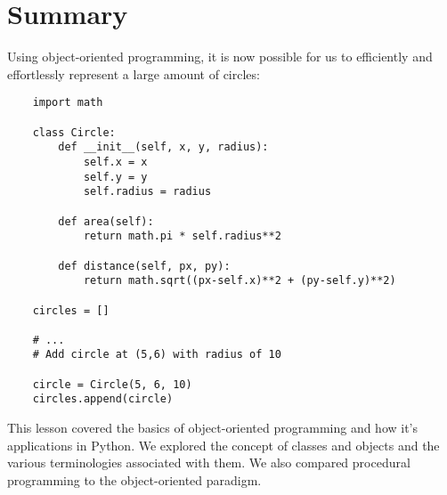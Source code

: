 \documentclass{cslesson}
\begin{document}
\section{Summary}
Using object-oriented programming, it is now possible for us to efficiently and effortlessly represent a large amount of circles:
\begin{verbatim}
    import math

    class Circle:
        def __init__(self, x, y, radius):
            self.x = x
            self.y = y
            self.radius = radius

        def area(self):
            return math.pi * self.radius**2

        def distance(self, px, py):
            return math.sqrt((px-self.x)**2 + (py-self.y)**2)

    circles = []

    # ...
    # Add circle at (5,6) with radius of 10

    circle = Circle(5, 6, 10)
    circles.append(circle)
\end{verbatim}

This lesson covered the basics of object-oriented programming and how it's applications in Python. We explored the concept of classes and objects
and the various terminologies associated with them. We also compared procedural programming to the object-oriented paradigm. 
\end{document}
